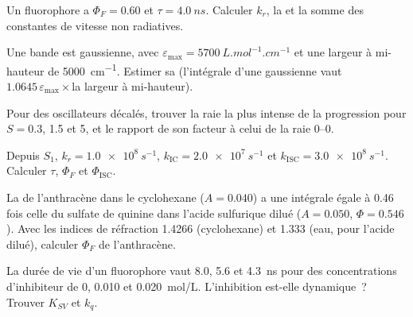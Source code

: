 \begin{exercise}[$\star$]\label{exo:b3:electronic-spectroscopy:4}
Un fluorophore a $\Phi_F = 0.60$ et $\tau = \qty{4.0}{ns}$. Calculer $k_r$,
la  et la somme des constantes de vitesse non
radiatives.
\end{exercise}

\begin{exercise}[$\star\star$]\label{exo:b3:electronic-spectroscopy:5}
Une bande est gaussienne, avec $\varepsilon_{\max} = \qty{5700}{L.mol^{-1}.cm^{-1}}$ et une largeur à
mi-hauteur de \qty{5000}{cm^{-1}}. Estimer sa 
(l'intégrale d'une gaussienne vaut $1.0645\,\varepsilon_{\max}\times$la
largeur à mi-hauteur).
\end{exercise}

\begin{exercise}[$\star\star$]\label{exo:b3:electronic-spectroscopy:6}
Pour des oscillateurs décalés, trouver la raie la plus intense de la
progression pour
$S = 0.3$, 1.5 et 5, et le rapport de son facteur à celui de la raie
0--0.
\end{exercise}

\begin{exercise}[$\star\star$]\label{exo:b3:electronic-spectroscopy:7}
Depuis $S_1$, $k_r = \qty{1.0e8}{s^{-1}}$, $k_{\mathrm{IC}} = \qty{2.0e7}{s^{-1}}$ et $k_{\mathrm{ISC}} =
\qty{3.0e8}{s^{-1}}$. Calculer $\tau$, $\Phi_F$ et $\Phi_{\mathrm{ISC}}$.
\end{exercise}

\begin{exercise}[$\star\star$]\label{exo:b3:electronic-spectroscopy:8}
La  de l'anthracène dans le cyclohexane ($A = 0.040$) a une
intégrale égale à 0.46 fois celle du sulfate de quinine dans l'acide
sulfurique dilué ($A = 0.050$, $\Phi =
0.546$). Avec les indices de réfraction 1.4266 (cyclohexane) et 1.333
(eau, pour l'acide dilué), calculer $\Phi_F$ de l'anthracène.
\end{exercise}

\begin{exercise}[$\star\star$]\label{exo:b3:electronic-spectroscopy:9}
La durée de vie d'un fluorophore vaut 8.0, 5.6 et \qty{4.3}{ns} pour des
concentrations d'inhibiteur de 0, 0.010 et \qty{0.020}{mol/L}.
L'inhibition est-elle dynamique~? Trouver
$K_{SV}$ et $k_q$.
\end{exercise}

